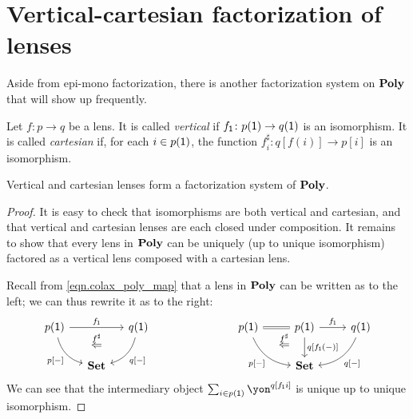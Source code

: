 \documentclass[Book-Poly]{subfiles}
\begin{document}
\section{Vertical-cartesian factorization of lenses}

Aside from epi-mono factorization, there is another factorization system on $\mathbf{Poly}$ that will show up frequently.

\begin{definition} \label{def.vert_cart}
Let $f\colon p\to q$ be a lens.
It is called \emph{vertical} if $f_{\textsf{1}}\colon p(\textsf{1})\to q(\textsf{1})$ is an isomorphism.
It is called \emph{cartesian} if, for each $i\in p(\textsf{1})$, the function $f^\sharp_i\colon q[f(i)]\to p[i]$ is an isomorphism.
\end{definition}

\begin{proposition}\label{prop.vert_cart_factorization}
Vertical and cartesian lenses form a factorization system of $\mathbf{Poly}$.
\end{proposition}
\begin{proof}
It is easy to check that isomorphisms are both vertical and cartesian, and that vertical and cartesian lenses are each closed under composition.
It remains to show that every lens in $\mathbf{Poly}$ can be uniquely (up to unique isomorphism) factored as a vertical lens composed with a cartesian lens.

Recall from \eqref{eqn.colax_poly_map} that a lens in $\mathbf{Poly}$ can be written as to the left; we can thus rewrite it as to the right:
\[
\begin{tikzcd}[column sep=small]
	p(\1)\ar[dr, bend right, "{p[-]}"']\ar[rr, "f_\1"]&~&
	q(\1)\ar[dl, bend left, "{q[-]}"]\\&
	\smset\ar[u, phantom, near end, "\overset{f^\sharp}{\Leftarrow}"]
\end{tikzcd}
\hspace{1in}
\begin{tikzcd}
	p(\1)\ar[dr, bend right, "{p[-]}"']\ar[r, equal, ""' name=equal]&
	p(\1)\ar[d, "{q[f_\1(-)]}"]\ar[r, "f_\1"]&
	q(\1)\ar[dl, bend left, "{q[-]}"]\\&
	|[alias=set]|\smset\ar[from=equal, to=set, pos=.3, phantom, "\overset{f^\sharp}{\Leftarrow}"]
\end{tikzcd}
\]
We can see that the intermediary object $\sum_{i\in p(\1)} \yon^{q[f_\1i]}$ is unique up to unique isomorphism.
\end{proof}
\end{document}
